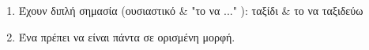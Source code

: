 \section*{}
\begin{enumerate}
\item Έχουν διπλή σημασία (ουσιαστικό \& "το να ..." ):  ταξίδι \& το να ταξιδεύω
\item Ένα  πρέπει να είναι πάντα σε ορισμένη μορφή.
\end{enumerate}
